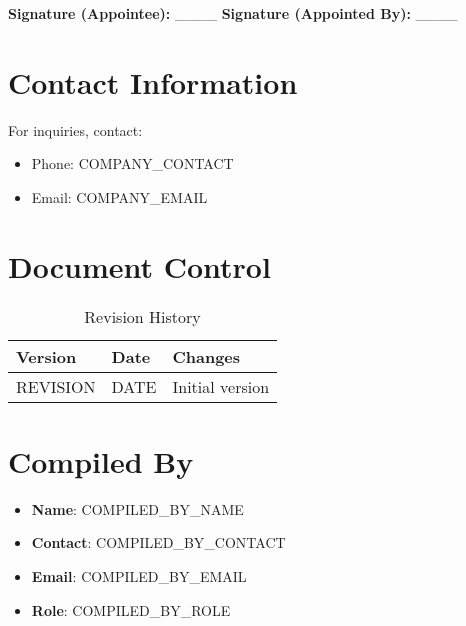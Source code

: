\documentclass[12pt]{article}
\begin{document}
\textbf{Signature (Appointee):} \_\_\_\_ \textbf{Signature (Appointed By):} \_\_\_\_

\section{Contact Information}
For inquiries, contact:
\begin{itemize}
    \item Phone: {{COMPANY_CONTACT}}
    \item Email: {{COMPANY_EMAIL}}
\end{itemize}

\section{Document Control}
\begin{table}[h]
    \centering
    \begin{tabular}{p{3cm}p{3cm}p{6cm}}
        \toprule
        \textbf{Version} & \textbf{Date} & \textbf{Changes} \\
        \midrule
        {{REVISION}} & {{DATE}} & Initial version \\
        \bottomrule
    \end{tabular}
    \caption{Revision History}
\end{table}

\section{Compiled By}
\begin{itemize}
    \item \textbf{Name}: {{COMPILED_BY_NAME}}
    \item \textbf{Contact}: {{COMPILED_BY_CONTACT}}
    \item \textbf{Email}: {{COMPILED_BY_EMAIL}}
    \item \textbf{Role}: {{COMPILED_BY_ROLE}}
\end{itemize}
\end{document}
